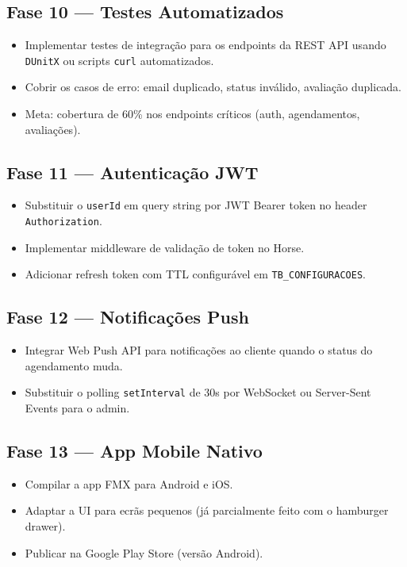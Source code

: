\documentclass[12pt,a4paper]{article}
\begin{document}
\subsection{Fase 10 — Testes Automatizados}

\begin{itemize}
  \item Implementar testes de integração para os endpoints da REST API usando \texttt{DUnitX} ou scripts \texttt{curl} automatizados.
  \item Cobrir os casos de erro: email duplicado, status inválido, avaliação duplicada.
  \item Meta: cobertura de 60\% nos endpoints críticos (auth, agendamentos, avaliações).
\end{itemize}

\subsection{Fase 11 — Autenticação JWT}

\begin{itemize}
  \item Substituir o \texttt{userId} em query string por JWT Bearer token no header \texttt{Authorization}.
  \item Implementar middleware de validação de token no Horse.
  \item Adicionar refresh token com TTL configurável em \texttt{TB\_CONFIGURACOES}.
\end{itemize}

\subsection{Fase 12 — Notificações Push}

\begin{itemize}
  \item Integrar Web Push API para notificações ao cliente quando o status do agendamento muda.
  \item Substituir o polling \texttt{setInterval} de 30s por WebSocket ou Server-Sent Events para o admin.
\end{itemize}

\subsection{Fase 13 — App Mobile Nativo}

\begin{itemize}
  \item Compilar a app FMX para Android e iOS.
  \item Adaptar a UI para ecrãs pequenos (já parcialmente feito com o hamburger drawer).
  \item Publicar na Google Play Store (versão Android).
\end{itemize}
\end{document}
